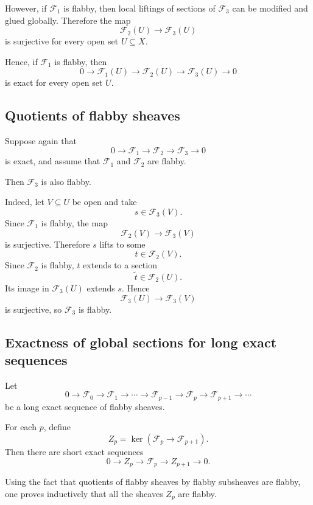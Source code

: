 \documentclass[12pt,a4paper]{article}
\theoremstyle{notespace}
\begin{document}
However, if $\mathcal F_1$ is flabby, then local liftings of sections of
$\mathcal F_3$ can be modified and glued globally. Therefore the map
\[
\mathcal F_2(U)\longrightarrow \mathcal F_3(U)
\]
is surjective for every open set $U\subseteq X$.

Hence, if $\mathcal F_1$ is flabby, then
\[
0\longrightarrow \mathcal F_1(U)
\longrightarrow \mathcal F_2(U)
\longrightarrow \mathcal F_3(U)
\longrightarrow 0
\]
is exact for every open set $U$.

\subsection*{Quotients of flabby sheaves}

Suppose again that
\[
0\longrightarrow \mathcal F_1
\longrightarrow \mathcal F_2
\longrightarrow \mathcal F_3
\longrightarrow 0
\]
is exact, and assume that $\mathcal F_1$ and $\mathcal F_2$ are flabby.

Then $\mathcal F_3$ is also flabby.

Indeed, let $V\subseteq U$ be open and take
\[
s\in \mathcal F_3(V).
\]
Since $\mathcal F_1$ is flabby, the map
\[
\mathcal F_2(V)\longrightarrow \mathcal F_3(V)
\]
is surjective. Therefore $s$ lifts to some
\[
t\in \mathcal F_2(V).
\]
Since $\mathcal F_2$ is flabby, $t$ extends to a section
\[
\widetilde t\in \mathcal F_2(U).
\]
Its image in $\mathcal F_3(U)$ extends $s$. Hence
\[
\mathcal F_3(U)\longrightarrow \mathcal F_3(V)
\]
is surjective, so $\mathcal F_3$ is flabby.

\subsection*{Exactness of global sections for long exact sequences}

Let
\[
0\longrightarrow \mathcal F_0
\longrightarrow \mathcal F_1
\longrightarrow \cdots
\longrightarrow \mathcal F_{p-1}
\longrightarrow \mathcal F_p
\longrightarrow \mathcal F_{p+1}
\longrightarrow \cdots
\]
be a long exact sequence of flabby sheaves.

For each $p$, define
\[
Z_p=\ker(\mathcal F_p\to \mathcal F_{p+1}).
\]
Then there are short exact sequences
\[
0\longrightarrow Z_p
\longrightarrow \mathcal F_p
\longrightarrow Z_{p+1}
\longrightarrow 0.
\]

Using the fact that quotients of flabby sheaves by flabby subsheaves are
flabby, one proves inductively that all the sheaves $Z_p$ are flabby.
\end{document}
